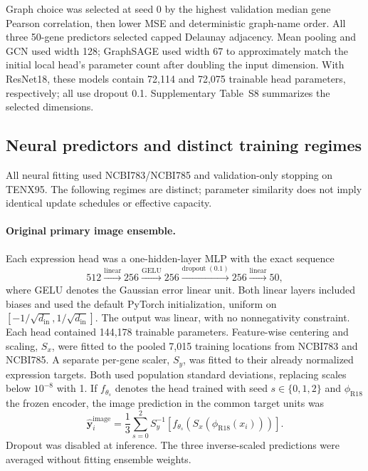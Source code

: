 Graph choice was selected at seed 0 by the highest validation median gene Pearson correlation, then lower MSE and deterministic graph-name order. All three 50-gene predictors selected capped Delaunay adjacency. Mean pooling and GCN used width 128; GraphSAGE used width 67 to approximately match the initial local head's parameter count after doubling the input dimension. With ResNet18, these models contain 72,114 and 72,075 trainable head parameters, respectively; all use dropout 0.1. Supplementary Table~S8 summarizes the selected dimensions.


\subsection{Neural predictors and distinct training regimes}
\label{sec:experiments}
All neural fitting used NCBI783/NCBI785 and validation-only stopping on TENX95. The following regimes are distinct; parameter similarity does not imply identical update schedules or effective capacity.

\paragraph{Original primary image ensemble.}
Each expression head was a one-hidden-layer MLP with the exact sequence
\begin{equation}
512 \xrightarrow{\mathrm{linear}}256
\xrightarrow{\mathrm{GELU}}256
\xrightarrow{\mathrm{dropout}\;(0.1)}256
\xrightarrow{\mathrm{linear}}50,
\label{eq:head}
\end{equation}
where GELU denotes the Gaussian error linear unit. Both linear layers included biases and used the default PyTorch initialization, uniform on $[-1/\sqrt{d_{\mathrm{in}}},1/\sqrt{d_{\mathrm{in}}}]$. The output was linear, with no nonnegativity constraint. Each head contained 144,178 trainable parameters. Feature-wise centering and scaling, $S_x$, were fitted to the pooled 7,015 training locations from NCBI783 and NCBI785. A separate per-gene scaler, $S_y$, was fitted to their already normalized expression targets. Both used population standard deviations, replacing scales below $10^{-8}$ with 1. If $f_{\theta_s}$ denotes the head trained with seed $s\in\{0,1,2\}$ and $\phi_{\mathrm{R18}}$ the frozen encoder, the image prediction in the common target units was
\begin{equation}
\widehat{\boldsymbol y}^{\mathrm{image}}_i
=\frac{1}{3}\sum_{s=0}^{2}
S_y^{-1}\!\left[f_{\theta_s}\!\left(S_x\!\left(\phi_{\mathrm{R18}}(x_i)\right)\right)\right].
\label{eq:image_ensemble}
\end{equation}
Dropout was disabled at inference. The three inverse-scaled predictions were averaged without fitting ensemble weights.

